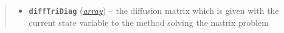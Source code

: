 \documentclass[a4paper,10pt,english]{sphinxmanual}
\begin{document}
\begin{fulllineitems}
\begin{fulllineitems}
\begin{quote}
\begin{description}
\begin{itemize}
\item {} 
\textbf{\texttt{diffTriDiag}} (\href{http://docs.python.org/2.7/library/array.html\#module-array}{\emph{array}}) -- the diffusion matrix which is given 
with the current state variable to 
the method solving the matrix problem

\end{itemize}

\end{description}\end{quote}

\end{fulllineitems}


\end{fulllineitems}

\end{document}

